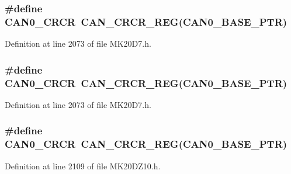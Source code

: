\subsubsection[{\texorpdfstring{C\+A\+N0\+\_\+\+C\+R\+CR}{CAN0_CRCR}}]{\setlength{\rightskip}{0pt plus 5cm}\#define C\+A\+N0\+\_\+\+C\+R\+CR~{\bf C\+A\+N\+\_\+\+C\+R\+C\+R\+\_\+\+R\+EG}({\bf C\+A\+N0\+\_\+\+B\+A\+S\+E\+\_\+\+P\+TR})}\hypertarget{group___c_a_n___register___accessor___macros_gaa7ba4d0bdea9c6227276f7747531cb20}{}\label{group___c_a_n___register___accessor___macros_gaa7ba4d0bdea9c6227276f7747531cb20}


Definition at line 2073 of file M\+K20\+D7.\+h.

\subsubsection[{\texorpdfstring{C\+A\+N0\+\_\+\+C\+R\+CR}{CAN0_CRCR}}]{\setlength{\rightskip}{0pt plus 5cm}\#define C\+A\+N0\+\_\+\+C\+R\+CR~{\bf C\+A\+N\+\_\+\+C\+R\+C\+R\+\_\+\+R\+EG}({\bf C\+A\+N0\+\_\+\+B\+A\+S\+E\+\_\+\+P\+TR})}\hypertarget{group___c_a_n___register___accessor___macros_gaa7ba4d0bdea9c6227276f7747531cb20}{}\label{group___c_a_n___register___accessor___macros_gaa7ba4d0bdea9c6227276f7747531cb20}


Definition at line 2073 of file M\+K20\+D7.\+h.

\subsubsection[{\texorpdfstring{C\+A\+N0\+\_\+\+C\+R\+CR}{CAN0_CRCR}}]{\setlength{\rightskip}{0pt plus 5cm}\#define C\+A\+N0\+\_\+\+C\+R\+CR~{\bf C\+A\+N\+\_\+\+C\+R\+C\+R\+\_\+\+R\+EG}({\bf C\+A\+N0\+\_\+\+B\+A\+S\+E\+\_\+\+P\+TR})}\hypertarget{group___c_a_n___register___accessor___macros_gaa7ba4d0bdea9c6227276f7747531cb20}{}\label{group___c_a_n___register___accessor___macros_gaa7ba4d0bdea9c6227276f7747531cb20}


Definition at line 2109 of file M\+K20\+D\+Z10.\+h.

